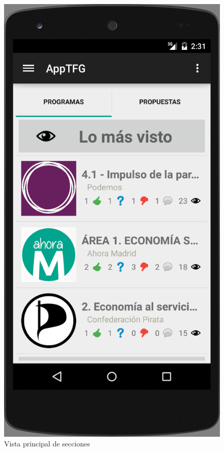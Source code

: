 \begin{figure}[H]
\centering
\includegraphics[keepaspectratio, scale=0.5]{Media/Captures/captTopSections.png}
\caption{Vista principal de secciones}
\label{fig:captTopSections}
\end{figure}

